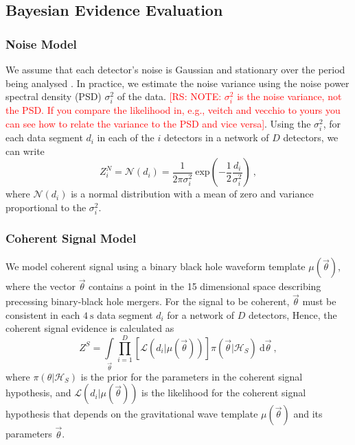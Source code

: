 \documentclass[%
preprint,
 amsmath,amssymb,
 aps,
]{revtex4}
\newcommand{\psd}{{\sc $\sigma^2_i$}\xspace}
\newcommand{\template}{{\sc $\mu(\vec{\theta})$}\xspace}
\newcommand{\parameters}{{\sc $\vec{\theta}$}\xspace}
\newcommand{\rs}[1]{\textcolor{red}{[RS: #1]}}
\begin{document}
\subsection{Bayesian Evidence Evaluation}
\subsubsection{Noise Model}
We assume that each detector's noise is Gaussian and stationary over the period being analysed \cite{ligo_psd}. In practice, we estimate the noise variance using the noise power spectral density (PSD)  \psd of the data. \rs{NOTE: $\sigma_i^2$ is the noise variance, not the PSD. If you compare the likelihood in, e.g., veitch and vecchio to yours you can see how to relate the variance to the PSD and vice versa}. Using the \psd, for each data segment $d_i$ in each of the $i$ detectors in a network of $D$ detectors, we can write 
\begin{equation}
\label{eq:zn}
Z^N_i = \mathcal{N}(d_i) = \frac{1}{2\pi \sigma^2_i} \ \text{exp}\left(-\frac{1}{2} \frac{d_i}{\sigma^2_i} \right) \ ,
\end{equation}
where $\mathcal{N}(d_i)$ is a normal distribution with a mean of zero and variance proportional to the \psd. 

\subsubsection{Coherent Signal Model}
We model coherent signal using a binary black hole waveform template \template, where the vector \parameters contains a point in the 15 dimensional space describing precessing binary-black hole mergers. For the signal to be coherent, \parameters must be consistent in each $4\ \text{s}$ data segment $d_i$ for a network of $D$ detectors, Hence, the coherent signal evidence is calculated as
\begin{equation}
\label{eq:zs}
Z^S = \int\limits_{\vec{\theta}} \prod\limits^{D}_{i=1} \left[ \mathcal{L}(d_i|\mu(\vec{\theta}))\right] \pi(\vec{\theta}| \mathcal{H}_S)\  \text{d}\vec{\theta} \ ,
\end{equation}
where $\pi(\theta| \mathcal{H}_S)$ is the prior for the parameters in the coherent signal hypothesis, and $\mathcal{L}(d_i|\mu(\vec{\theta}))$ is the likelihood for the coherent signal hypothesis that depends on the gravitational wave template \template and its parameters \parameters. 
\end{document}
